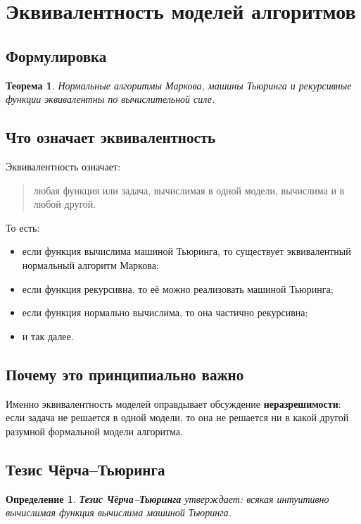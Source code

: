 \documentclass[12pt,a4paper]{article}
\newtheorem{definition}{Определение}
\newtheorem{theorem}{Теорема}
\begin{document}
\section{Эквивалентность моделей алгоритмов}

\subsection{Формулировка}
\begin{theorem}
Нормальные алгоритмы Маркова, машины Тьюринга и рекурсивные функции эквивалентны по вычислительной силе.
\end{theorem}

\subsection{Что означает эквивалентность}
Эквивалентность означает:
\begin{quote}
любая функция или задача, вычислимая в одной модели, вычислима и в любой другой.
\end{quote}

То есть:
\begin{itemize}
    \item если функция вычислима машиной Тьюринга, то существует эквивалентный нормальный алгоритм Маркова;
    \item если функция рекурсивна, то её можно реализовать машиной Тьюринга;
    \item если функция нормально вычислима, то она частично рекурсивна;
    \item и так далее.
\end{itemize}

\subsection{Почему это принципиально важно}
Именно эквивалентность моделей оправдывает обсуждение \textbf{неразрешимости}:
если задача не решается в одной модели, то она не решается ни в какой другой разумной формальной модели алгоритма.

\subsection{Тезис Чёрча--Тьюринга}
\begin{definition}
\textbf{Тезис Чёрча--Тьюринга} утверждает: всякая интуитивно вычислимая функция вычислима машиной Тьюринга.
\end{definition}
\end{document}
